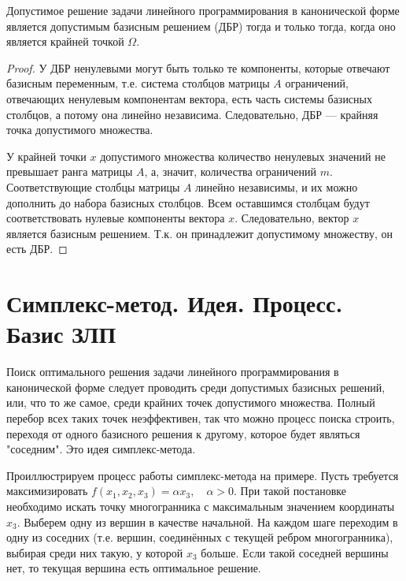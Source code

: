 \documentclass[17pt]{extarticle}
\begin{document}
\begin{theorem}
    Допустимое решение задачи линейного программирования в канонической форме является допустимым базисным решением (ДБР) тогда и только тогда, когда оно является крайней точкой \( \Omega \).
\end{theorem}

\begin{proof}
    У ДБР ненулевыми могут быть только те компоненты, которые отвечают базисным переменным, т.е. система столбцов матрицы \( A \) ограничений, отвечающих ненулевым компонентам вектора, есть часть системы базисных столбцов, а потому она линейно независима. Следовательно, ДБР — крайняя точка допустимого множества.

    У крайней точки \( x \) допустимого множества количество ненулевых значений не превышает ранга матрицы \( A \), а, значит, количества ограничений \( m \). Соответствующие столбцы матрицы \( A \) линейно независимы, и их можно дополнить до набора базисных столбцов. Всем оставшимся столбцам будут соответствовать нулевые компоненты вектора \( x \). Следовательно, вектор \( x \) является базисным решением. Т.к. он принадлежит допустимому множеству, он есть ДБР.
\end{proof}




\section{Симплекс-метод. Идея. Процесс. Базис ЗЛП}

Поиск оптимального решения задачи линейного программирования в канонической форме следует проводить среди допустимых базисных решений, или, что то же самое, среди крайних точек допустимого множества. Полный перебор всех таких точек неэффективен, так что можно процесс поиска строить, переходя от одного базисного решения к другому, которое будет являться "соседним". Это идея симплекс-метода.

Проиллюстрируем процесс работы симплекс-метода на примере. Пусть требуется максимизировать \( f(x_1, x_2, x_3) = \alpha x_3, \quad \alpha > 0 \). При такой постановке необходимо искать точку многогранника с максимальным значением координаты \( x_3 \).
Выберем одну из вершин в качестве начальной. На каждом шаге переходим в одну из соседних (т.е. вершин, соединённых с текущей ребром многогранника), выбирая среди них такую, у которой \( x_3 \) больше. Если такой соседней вершины нет, то текущая вершина есть оптимальное решение.
\end{document}
